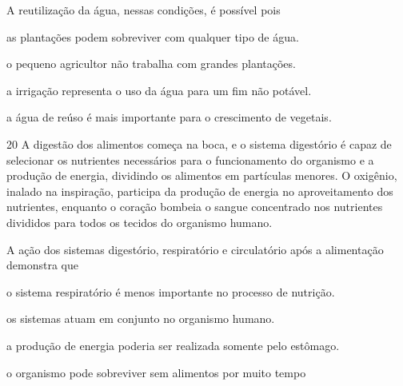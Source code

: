 A reutilização da água, nessas condições, é possível pois

\begin{escolha}
\item as plantações podem sobreviver com qualquer tipo de água.

\item o pequeno agricultor não trabalha com grandes plantações.

\item a irrigação representa o uso da água para um fim não potável.

\item a água de reúso é mais importante para o crescimento de vegetais.
\end{escolha}


\pagebreak
\num{20} A digestão dos alimentos começa na boca, e o sistema
digestório é capaz de selecionar os nutrientes necessários para o
funcionamento do organismo e a produção de energia, dividindo os
alimentos em partículas menores. O oxigênio, inalado na inspiração,
participa da produção de energia no aproveitamento dos nutrientes,
enquanto o coração bombeia o sangue concentrado nos nutrientes divididos
para todos os tecidos do organismo humano.

A ação dos sistemas digestório, respiratório e circulatório após a
alimentação demonstra que

\begin{escolha}
\item o sistema respiratório é menos importante no processo de nutrição.

\item os sistemas atuam em conjunto no organismo humano.

\item a produção de energia poderia ser realizada somente pelo estômago.

\item o organismo pode sobreviver sem alimentos por muito tempo
\end{escolha}

